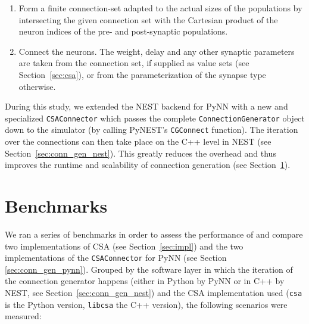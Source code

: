 \documentclass{frontiersSCNS} %
\begin{document}
\begin{enumerate}
\item Form a finite connection-set adapted to the actual sizes of the
  populations by intersecting the given connection set with the
  Cartesian product of the neuron indices of the pre- and
  post-synaptic populations.
\item Connect the neurons. The weight, delay and any other synaptic
  parameters are taken from the connection set, if supplied as value
  sets (see Section~\ref{sec:csa}), or from the parameterization of
  the synapse type otherwise.
\end{enumerate}

During this study, we extended the NEST backend for PyNN with a new
and specialized \verb|CSAConnector| which passes the complete
\verb|ConnectionGenerator| object down to the simulator (by calling
PyNEST's \verb|CGConnect| function). The iteration over the
connections can then take place on the C++ level in NEST (see
Section~\ref{sec:conn_gen_nest}). This greatly reduces the overhead
and thus improves the runtime and scalability of connection generation
(see Section~\ref{sec:benchmarks}).


\section{Benchmarks}\label{sec:benchmarks}

We ran a series of benchmarks in order to assess the performance of
and compare two implementations of CSA (see Section~\ref{sec:impl})
and the two implementations of the \verb|CSAConnector| for PyNN (see
Section \ref{sec:conn_gen_pynn}). Grouped by the software layer in
which the iteration of the connection generator happens (either in
Python by PyNN or in C++ by NEST, see Section~\ref{sec:conn_gen_nest})
and the CSA implementation used (\verb|csa| is the Python version,
\verb|libcsa| the C++ version), the following scenarios were measured:
\end{document}
